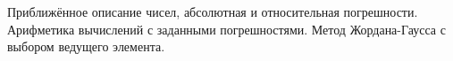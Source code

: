 \documentclass[__main__.tex]{subfiles}
\begin{document}
Приближённое описание чисел, абсолютная и относительная погрешности. Арифметика вычислений с заданными погрешностями. Метод Жордана-Гаусса с выбором ведущего элемента.
\end{document}
